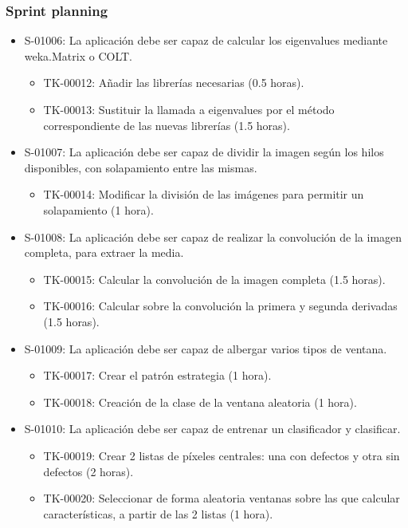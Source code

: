 \subsubsection*{Sprint planning}
\begin{itemize}
 \item S-01006: La aplicación debe ser capaz de calcular los eigenvalues mediante weka.Matrix o COLT.
 \begin{itemize}
  \item TK-00012: Añadir las librerías necesarias (0.5 horas).
  \item TK-00013: Sustituir la llamada a eigenvalues por el método correspondiente de las nuevas librerías (1.5 horas).
 \end{itemize}
 \item S-01007: La aplicación debe ser capaz de dividir la imagen según los hilos disponibles, con solapamiento entre las mismas.
 \begin{itemize}
  \item TK-00014: Modificar la división de las imágenes para permitir un solapamiento (1 hora).
 \end{itemize}
 \item S-01008: La aplicación debe ser capaz de realizar la convolución de la imagen completa, para extraer la media.
 \begin{itemize}
  \item TK-00015: Calcular la convolución de la imagen completa (1.5 horas).
  \item TK-00016: Calcular sobre la convolución la primera y segunda derivadas (1.5 horas).
 \end{itemize}
 \item S-01009: La aplicación debe ser capaz de albergar varios tipos de ventana.
 \begin{itemize}
  \item TK-00017: Crear el patrón estrategia (1 hora).
  \item TK-00018: Creación de la clase de la ventana aleatoria (1 hora).
 \end{itemize}
 \item S-01010: La aplicación debe ser capaz de entrenar un clasificador y clasificar.
 \begin{itemize}
  \item TK-00019: Crear 2 listas de píxeles centrales: una con defectos y otra sin defectos (2 horas).
  \item TK-00020: Seleccionar de forma aleatoria ventanas sobre las que calcular características, a partir de las 2 listas (1 hora).

\end{itemize}
\end{itemize}
